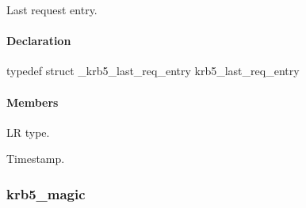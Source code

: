 \documentclass[letterpaper,10pt,english]{sphinxmanual}
\begin{document}
Last request entry.


\paragraph{Declaration}
\label{appdev/refs/types/krb5_last_req_entry:declaration}
typedef struct \_krb5\_last\_req\_entry  krb5\_last\_req\_entry


\paragraph{Members}
\label{appdev/refs/types/krb5_last_req_entry:members}

\begin{fulllineitems}
\label{appdev/refs/types/krb5_last_req_entry:krb5_last_req_entry.magic}
\end{fulllineitems}


\begin{fulllineitems}
\label{appdev/refs/types/krb5_last_req_entry:krb5_last_req_entry.lr_type}
LR type.

\end{fulllineitems}


\begin{fulllineitems}
\label{appdev/refs/types/krb5_last_req_entry:krb5_last_req_entry.value}
Timestamp.

\end{fulllineitems}



\subsubsection{krb5\_magic}
\label{appdev/refs/types/krb5_magic:krb5-magic}\label{appdev/refs/types/krb5_magic::doc}\label{appdev/refs/types/krb5_magic:krb5-magic-struct}

\begin{fulllineitems}
\label{appdev/refs/types/krb5_magic:krb5_magic}
\end{fulllineitems}
\end{document}
